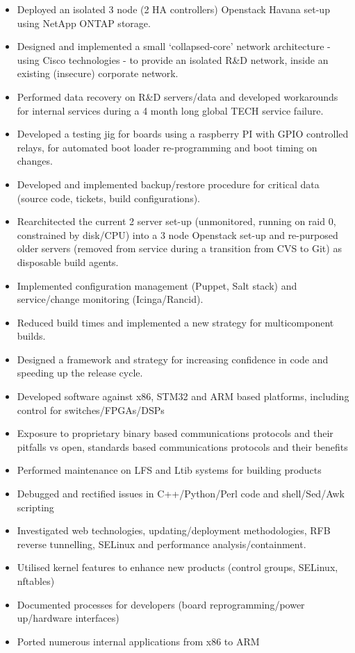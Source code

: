 \begin{itemize}
\item
  Deployed an isolated 3 node (2 HA controllers) Openstack Havana set-up
  using NetApp ONTAP storage.
\item
  Designed and implemented a small `collapsed-core' network architecture
  - using Cisco technologies - to provide an isolated R\&D network,
  inside an existing (insecure) corporate network.
\item
  Performed data recovery on R\&D servers/data and developed workarounds
  for internal services during a 4 month long global TECH service
  failure.
\item
  Developed a testing jig for boards using a raspberry PI with GPIO
  controlled relays, for automated boot loader re-programming and boot
  timing on changes.
\item
  Developed and implemented backup/restore procedure for critical data
  (source code, tickets, build configurations).
\item
  Rearchitected the current 2 server set-up (unmonitored, running on
  raid 0, constrained by disk/CPU) into a 3 node Openstack set-up and
  re-purposed older servers (removed from service during a transition
  from CVS to Git) as disposable build agents.
\item
  Implemented configuration management (Puppet, Salt stack) and
  service/change monitoring (Icinga/Rancid).
\item
  Reduced build times and implemented a new strategy for multicomponent
  builds.
\item
  Designed a framework and strategy for increasing confidence in code
  and speeding up the release cycle.
\item
  Developed software against x86, STM32 and ARM based platforms,
  including control for switches/FPGAs/DSPs
\item
  Exposure to proprietary binary based communications protocols and
  their pitfalls vs open, standards based communications protocols and
  their benefits
\item
  Performed maintenance on LFS and Ltib systems for building products
\item
  Debugged and rectified issues in C++/Python/Perl code and
  shell/Sed/Awk scripting
\item
  Investigated web technologies, updating/deployment methodologies, RFB
  reverse tunnelling, SELinux and performance analysis/containment.
\item
  Utilised kernel features to enhance new products (control groups,
  SELinux, nftables)
\item
  Documented processes for developers (board reprogramming/power
  up/hardware interfaces)
\item
  Ported numerous internal applications from x86 to ARM
\end{itemize}

